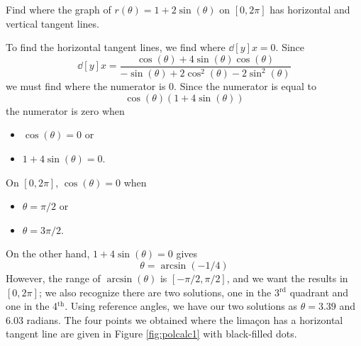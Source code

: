\documentclass{ximera}
\begin{document}
\begin{example}
Find where the graph of $r(\theta) =1+2\sin(\theta)$ on $[0,2\pi]$ has
horizontal and vertical tangent lines.
\begin{explanation}
  To find the horizontal tangent lines, we find where $\dd[y]{x}=0$.
  Since
  \[
  \dd[y]{x} =\frac{\cos(\theta) + 4\sin(\theta)\cos(\theta)}{-\sin(\theta) + 2\cos^2(\theta)-2\sin^2(\theta)}
  \]
  we must find where the numerator is $0$. Since the numerator is equal to
  \[
  \cos(\theta)(1+ 4\sin(\theta))
  \]
  the numerator is zero when 
  \begin{itemize}
  \item $\cos(\theta)=0$ or
  \item $1+4\sin(\theta)=0$.
  \end{itemize}
  On $[0,2\pi]$, $\cos(\theta)=0$ when
  \begin{itemize}
  \item $\theta=\pi/2$ or
  \item $\theta= 3\pi/2$.
  \end{itemize}
  On the other hand, $1+ 4\sin(\theta)=0$ gives
  \[
  \theta=\arcsin(-1/4)
  \]
  However, the range of $\arcsin(\theta)$ is $[-\pi/2,\pi/2]$, and we
  want the results in $[0,2\pi]$; we also recognize there are two
  solutions, one in the 3$^\text{rd}$ quadrant and one in the
  4$^\text{th}$. Using reference angles, we have our two solutions as
  $\theta =3.39$ and $6.03$ radians. The four points we obtained where
  the lima\c con has a horizontal tangent line are given in Figure
  \ref{fig:polcalc1} with black-filled dots.


\end{explanation}
\end{example}
\end{document}
